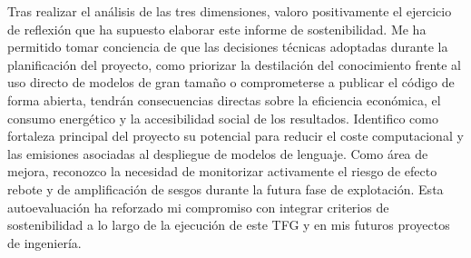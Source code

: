 Tras realizar el análisis de las tres dimensiones, valoro positivamente el ejercicio de reflexión que ha supuesto elaborar este informe de sostenibilidad. Me ha permitido tomar conciencia de que las decisiones técnicas adoptadas durante la planificación del proyecto, como priorizar la destilación del conocimiento frente al uso directo de modelos de gran tamaño o comprometerse a publicar el código de forma abierta, tendrán consecuencias directas sobre la eficiencia económica, el consumo energético y la accesibilidad social de los resultados. Identifico como fortaleza principal del proyecto su potencial para reducir el coste computacional y las emisiones asociadas al despliegue de modelos de lenguaje. Como área de mejora, reconozco la necesidad de monitorizar activamente el riesgo de efecto rebote y de amplificación de sesgos durante la futura fase de explotación. Esta autoevaluación ha reforzado mi compromiso con integrar criterios de sostenibilidad a lo largo de la ejecución de este TFG y en mis futuros proyectos de ingeniería.

